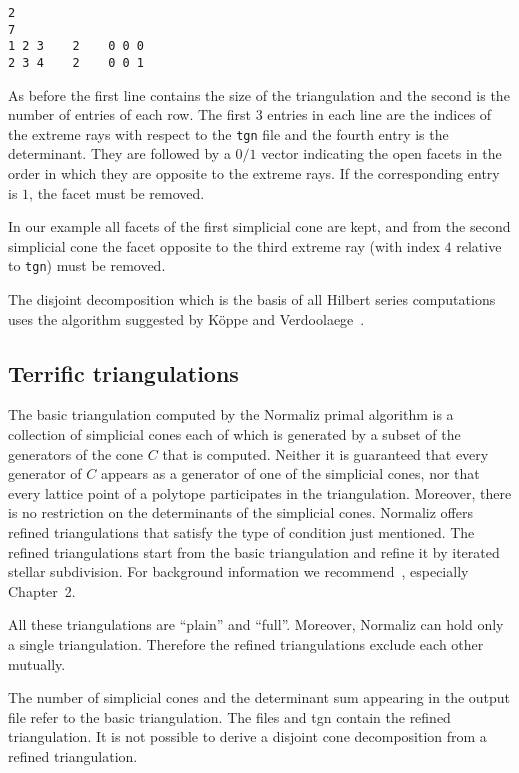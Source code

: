 \begin{Verbatim}
2
7
1 2 3    2    0 0 0
2 3 4    2    0 0 1
\end{Verbatim}

As before the first line contains the size of the triangulation and the second is the number of entries of each row.
The first $3$ entries in each line are the indices of the extreme rays with respect to the \verb|tgn| file and the fourth entry is the determinant. They are followed by a $0/1$ vector indicating the open facets in the order in which they are opposite to the extreme rays. If the corresponding entry is $1$, the facet must be removed.

In our example all facets of the first simplicial cone are kept, and from the second simplicial cone the facet opposite to the third extreme ray (with index $4$ relative to \verb|tgn|) must be removed.

The disjoint decomposition which is the basis of all Hilbert series computations uses the algorithm suggested by K\"oppe and Verdoolaege~\cite{KV}.

\subsection{Terrific triangulations}

The basic triangulation computed by the Normaliz primal algorithm is a collection of simplicial cones each of which is generated by a subset of the generators of the cone $C$ that is computed. Neither it is guaranteed that every generator of $C$ appears as a generator of one of the simplicial cones, nor that every lattice point of a polytope participates in the triangulation. Moreover, there is no restriction on the determinants of the simplicial cones. Normaliz offers refined triangulations that satisfy the type of condition just mentioned. The refined triangulations start from the basic triangulation and refine it by iterated stellar subdivision. For background information we recommend~\cite{BG}, especially Chapter~2.

All these triangulations are ``plain'' and ``full''. Moreover, Normaliz can hold only a single triangulation. Therefore the refined triangulations exclude each other mutually.

The number of simplicial cones and the determinant sum appearing in the output file refer to the basic triangulation. The files  and {tgn} contain the refined triangulation. It is not possible to derive a disjoint cone decomposition from a refined triangulation.

